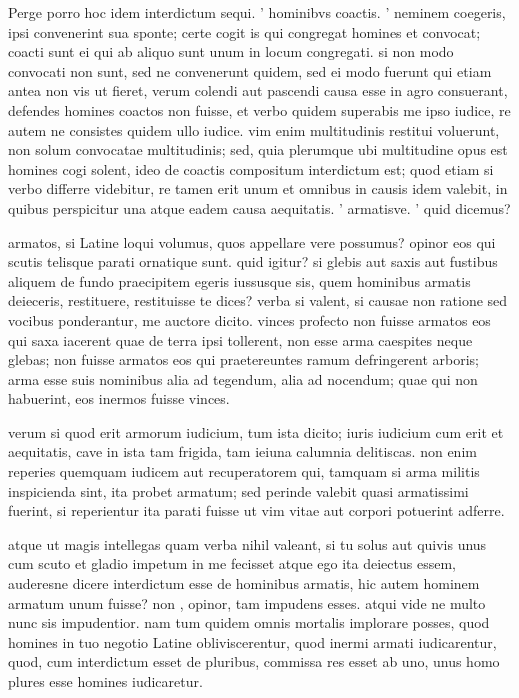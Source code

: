  Perge porro hoc idem interdictum sequi. ' hominibvs coactis. ' neminem coegeris, ipsi convenerint sua sponte; certe cogit is qui congregat homines et convocat; coacti sunt ei qui ab aliquo sunt unum in locum congregati. si non modo convocati non sunt, sed ne convenerunt quidem, sed ei modo fuerunt qui etiam antea non vis ut fieret, verum colendi aut pascendi causa esse in agro consuerant, defendes homines coactos non fuisse, et verbo quidem superabis me ipso iudice, re autem ne consistes quidem ullo iudice. vim enim multitudinis restitui voluerunt, non solum convocatae multitudinis; sed, quia plerumque ubi multitudine opus est homines cogi solent, ideo de coactis compositum interdictum est; quod etiam si verbo differre videbitur, re tamen erit unum et omnibus in causis idem valebit, in quibus perspicitur una atque eadem causa aequitatis. ' armatisve. ' quid dicemus?

 armatos, si Latine loqui volumus, quos appellare vere possumus? opinor eos qui scutis telisque parati ornatique sunt. quid igitur? si glebis aut saxis aut fustibus aliquem de fundo praecipitem egeris iussusque sis, quem hominibus armatis deieceris, restituere, restituisse te dices? verba si valent, si causae non ratione sed vocibus ponderantur, me auctore dicito. vinces profecto non fuisse armatos eos qui saxa iacerent quae de terra ipsi tollerent, non esse arma caespites neque glebas; non fuisse armatos eos qui praetereuntes ramum defringerent arboris; arma esse suis nominibus alia ad tegendum, alia ad nocendum; quae qui non habuerint, eos inermos fuisse vinces.

 verum si quod erit armorum iudicium, tum ista dicito; iuris iudicium cum erit et aequitatis, cave in ista tam frigida, tam ieiuna calumnia delitiscas. non enim reperies quemquam iudicem aut recuperatorem qui, tamquam si arma militis inspicienda sint, ita probet armatum; sed perinde valebit quasi armatissimi fuerint, si reperientur ita parati fuisse ut vim vitae aut corpori potuerint adferre.

 atque ut magis intellegas quam verba nihil valeant, si tu solus aut quivis unus cum scuto et gladio impetum in me fecisset atque ego ita deiectus essem, auderesne dicere interdictum esse de hominibus armatis, hic autem hominem armatum unum fuisse? non , opinor, tam impudens esses. atqui vide ne multo nunc sis impudentior. nam tum quidem omnis mortalis implorare posses, quod homines in tuo negotio Latine obliviscerentur, quod inermi armati iudicarentur, quod, cum interdictum esset de pluribus, commissa res esset ab uno, unus homo plures esse homines iudicaretur.

